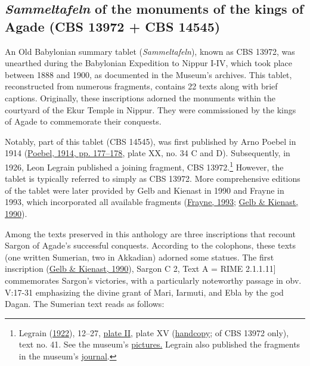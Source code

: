 \documentclass[
]{book}
\begin{document}
\hypertarget{sammeltafeln-of-the-monuments-of-the-kings-of-agade-cbs-13972-cbs-14545}{%
\subsection{\texorpdfstring{\emph{Sammeltafeln} of the monuments of the kings of Agade (CBS 13972 + CBS 14545)}{Sammeltafeln of the monuments of the kings of Agade (CBS 13972 + CBS 14545)}}\label{sammeltafeln-of-the-monuments-of-the-kings-of-agade-cbs-13972-cbs-14545}}

An Old Babylonian summary tablet (\emph{Sammeltafeln}), known as CBS 13972, was unearthed during the Babylonian Expedition to Nippur I-IV, which took place between 1888 and 1900, as documented in the Museum's archives. This tablet, reconstructed from numerous fragments, contains 22 texts along with brief captions. Originally, these inscriptions adorned the monuments within the courtyard of the Ekur Temple in Nippur. They were commissioned by the kings of Agade to commemorate their conquests.

Notably, part of this tablet (CBS 14545), was first published by Arno Poebel in 1914 (\protect\hyperlink{ref-Poebel1914}{Poebel, 1914, pp. 177--178}, plate XX, no. 34 C and D). Subsequently, in 1926, Leon Legrain published a joining fragment, CBS 13972.\footnote{Legrain (\protect\hyperlink{ref-Legrain1922}{1922}), 12--27, \href{https://archive.org/details/royalinscription00legr_0/page/55/mode/1up?view=theater}{plate II}, plate XV (\href{https://archive.org/details/royalinscription00legr_0/page/82/mode/1up}{handcopy}; of CBS 13972 only), text no. 41. See the museum's \href{https://www.penn.museum/collections/object_images.php?irn=347461}{pictures.} Legrain also published the fragments in the museum's \href{https://www.penn.museum/sites/journal/9818/}{journal}.} However, the tablet is typically referred to simply as CBS 13972. More comprehensive editions of the tablet were later provided by Gelb and Kienast in 1990 and Frayne in 1993, which incorporated all available fragments (\protect\hyperlink{ref-Frayne1993}{Frayne, 1993}; \protect\hyperlink{ref-GelbKienast1990}{Gelb \& Kienast, 1990}).

Among the texts preserved in this anthology are three inscriptions that recount Sargon of Agade's successful conquests. According to the colophons, these texts (one written Sumerian, two in Akkadian) adorned some statues. The first inscription (\protect\hyperlink{ref-GelbKienast1990}{Gelb \& Kienast, 1990}), Sargon C 2, Text A = RIME 2.1.1.11{]} commemorates Sargon's victories, with a particularly noteworthy passage in obv. V:17-31 emphasizing the divine grant of Mari, Iarmuti, and Ebla by the god Dagan. The Sumerian text reads as follows:
\end{document}
